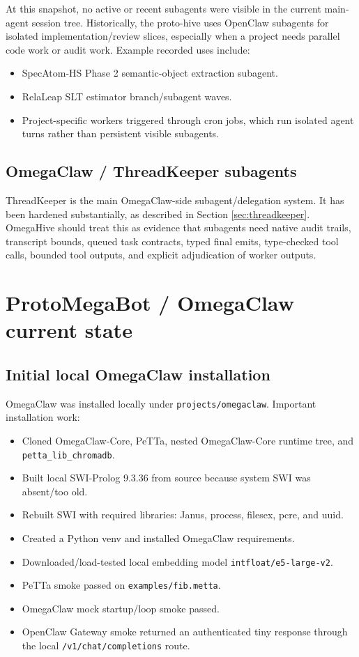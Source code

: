 \documentclass[11pt]{article}
\begin{document}
At this snapshot, no active or recent subagents were visible in the current main-agent session tree.  Historically, the proto-hive uses OpenClaw subagents for isolated implementation/review slices, especially when a project needs parallel code work or audit work.  Example recorded uses include:
\begin{itemize}
  \item SpecAtom-HS Phase 2 semantic-object extraction subagent.
  \item RelaLeap SLT estimator branch/subagent waves.
  \item Project-specific workers triggered through cron jobs, which run isolated agent turns rather than persistent visible subagents.
\end{itemize}

\subsection{OmegaClaw / ThreadKeeper subagents}

ThreadKeeper is the main OmegaClaw-side subagent/delegation system.  It has been hardened substantially, as described in Section \ref{sec:threadkeeper}.  OmegaHive should treat this as evidence that subagents need native audit trails, transcript bounds, queued task contracts, typed final emits, type-checked tool calls, bounded tool outputs, and explicit adjudication of worker outputs.

\section{ProtoMegaBot / OmegaClaw current state}

\subsection{Initial local OmegaClaw installation}

OmegaClaw was installed locally under \texttt{projects/omegaclaw}.  Important installation work:
\begin{itemize}
  \item Cloned OmegaClaw-Core, PeTTa, nested OmegaClaw-Core runtime tree, and \texttt{petta\_lib\_chromadb}.
  \item Built local SWI-Prolog 9.3.36 from source because system SWI was absent/too old.
  \item Rebuilt SWI with required libraries: Janus, process, filesex, pcre, and uuid.
  \item Created a Python venv and installed OmegaClaw requirements.
  \item Downloaded/load-tested local embedding model \texttt{intfloat/e5-large-v2}.
  \item PeTTa smoke passed on \texttt{examples/fib.metta}.
  \item OmegaClaw mock startup/loop smoke passed.
  \item OpenClaw Gateway smoke returned an authenticated tiny response through the local \texttt{/v1/chat/completions} route.
\end{itemize}
\end{document}
